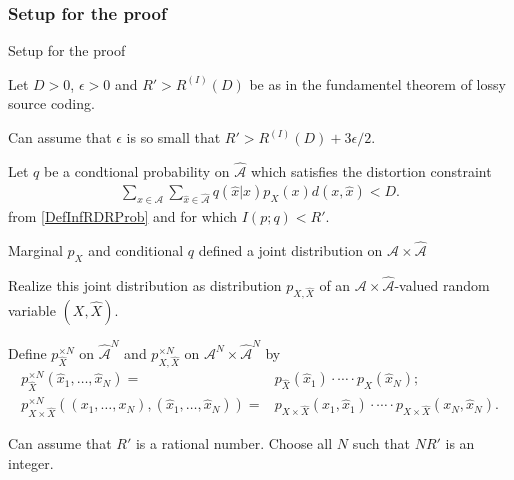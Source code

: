 \subsubsection{Setup for the proof} 
\begin{frame}{Setup for the proof}
\bit
\item Let $D>0$, $\epsilon>0$ and $R'>R^{(I)}(D)$ be as in the fundamentel theorem of lossy source coding. 
\item Can assume that $\epsilon$ is so small that $R'>R^{(I)}(D)+3\epsilon/2$.
\item Let $q$ be a condtional probability on $\hat{\mathcal{A}}$ which satisfies the distortion constraint
\begin{align*}
\sum_{x\in\mathcal{A}}\sum_{\hat{x}\in\hat{\mathcal{A}}}q(\hat{x}|x)p_X(x)d(x,\hat{x})<D. 
\end{align*}
from \eqref{DefInfRDRProb} and for which
$I(p;q)<R'$. 
\item Marginal $p_X$ and conditional $q$ defined a joint distribution on $\mathcal{A}\times\hat{\mathcal{A}}$  
\item Realize this joint distribution as distribution $p_{X,\hat{X}}$ of  
an $\mathcal{A}\times\hat{\mathcal{A}}$-valued random variable $(X,\hat{X})$. 
\item Define $p_{\hat{X}}^{\times N}$ on ${\hat{\mathcal{A}}}^N$ and  $p_{X,\hat{X}}^{\times N}$ on 
$\mathcal{A}^N\times\hat{{\mathcal{A}}}^N$ by
\begin{align}\label{DefJointII}
p_{\hat{X}}^{\times N}(\hat{x}_1,\dots,\hat{x}_N)=&p_{\hat{X}}(\hat{x}_1)\cdot \cdots\cdot p_{\hat{X}}(\hat{x}_N)\nonumber;
\\ p_{X\times\hat{X}}^{\times N}((x_1,\dots,x_N),(\hat{x}_1,\dots,\hat{x}_N))=&p_{X\times\hat{X}}(x_1,\hat{x}_1)\cdot \cdots\cdot p_{X\times\hat{X}}(x_N,\hat{x}_N).
\end{align}
\item Can assume that $R'$ is a rational number. Choose all $N$ such that $NR'$ is an integer.
\eit
\end{frame} 


